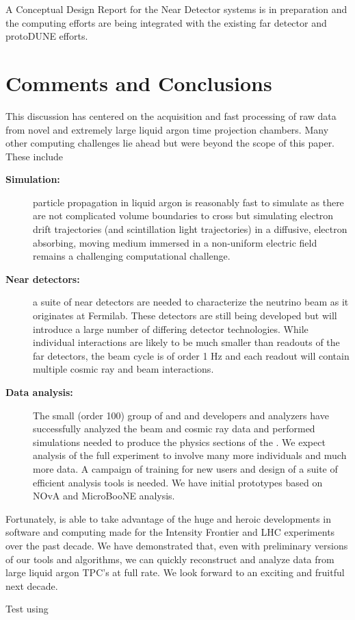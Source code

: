 A Conceptual Design Report for the Near Detector systems is in preparation and the  computing efforts are being integrated with the existing far detector and protoDUNE efforts. 



\section{Comments and Conclusions}
This discussion has centered on the acquisition and fast processing of raw data from novel and extremely large liquid argon time projection chambers. Many other computing challenges lie ahead but were beyond the scope of this paper.  These include

\begin{description}
\item[{\bf Simulation:}] particle propagation in liquid argon is reasonably fast to simulate as there are not complicated volume boundaries to cross but simulating electron drift trajectories (and scintillation light trajectories) in a diffusive, electron absorbing, moving medium immersed in a non-uniform  electric field remains a challenging computational challenge. 
\item[{\bf Near detectors:}] a suite of near detectors are needed to characterize the neutrino beam as it originates at Fermilab.  These detectors are still being developed but will introduce a large number of differing detector technologies.  While individual interactions are likely to be much smaller than readouts of the far detectors, the beam cycle is of order 1 Hz and each readout will contain multiple cosmic ray and beam interactions.
\item[{\bf Data analysis:} ] The small (order 100) group of  and  and  developers and analyzers have successfully analyzed the beam and cosmic ray data and performed simulations needed to produce the physics sections of the .  We expect analysis of the full experiment to involve many more individuals and much more data.  A campaign of training for new users and design of a suite of efficient analysis tools is needed.  We have initial prototypes based on NOvA and MicroBooNE analysis. 
\end{description}

Fortunately,  is able to take advantage of the huge and heroic developments in software and computing made for the Intensity Frontier and LHC experiments over the past decade.  We have demonstrated that, even with preliminary versions of our tools and algorithms, we can quickly reconstruct and analyze data from large liquid argon TPC's at full rate. We look forward to an exciting and fruitful next decade. 



Test using 